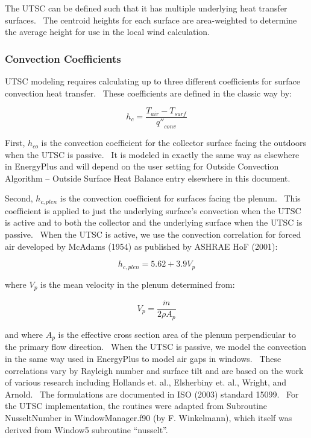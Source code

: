 The UTSC can be defined such that it has multiple underlying heat transfer surfaces.~ The centroid heights for each surface are area-weighted to determine the average height for use in the local wind calculation.

\subsubsection{Convection Coefficients}\label{convection-coefficients-000}

UTSC modeling requires calculating up to three different coefficients for surface convection heat transfer.~ These coefficients are defined in the classic way by:

\begin{equation}
{h_c} = \frac{{{T_{air}} - {T_{surf}}}}{{{{q''}_{conv}}}}
\end{equation}

First, \({h_{co}}\) is the convection coefficient for the collector surface facing the outdoors when the UTSC is passive.~ It is modeled in exactly the same way as elsewhere in EnergyPlus and will depend on the user setting for Outside Convection Algorithm -- Outside Surface Heat Balance entry elsewhere in this document.

Second, \({h_{c,plen}}\) is the convection coefficient for surfaces facing the plenum.~ This coefficient is applied to just the underlying surface's convection when the UTSC is active and to both the collector and the underlying surface when the UTSC is passive.~ When the UTSC is active, we use the convection correlation for forced air developed by McAdams (1954) as published by ASHRAE HoF (2001):

\begin{equation}
{h_{c,plen}} = 5.62 + 3.9{V_p}
\end{equation}

where \({V_p}\) is the mean velocity in the plenum determined from:

\begin{equation}
{V_p} = \frac{{\dot m}}{{2\rho {A_p}}}
\end{equation}

and where \({A_p}\) is the effective cross section area of the plenum perpendicular to the primary flow direction.~ When the UTSC is passive, we model the convection in the same way used in EnergyPlus to model air gaps in windows.~ These correlations vary by Rayleigh number and surface tilt and are based on the work of various research including Hollands et. al., Elsherbiny et. al., Wright, and Arnold.~ The formulations are documented in ISO (2003) standard 15099.~ For the UTSC implementation, the routines were adapted from Subroutine NusseltNumber in WindowManager.f90 (by F. Winkelmann), which itself was derived from Window5 subroutine ``nusselt''.

